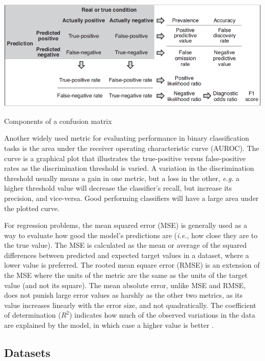 \begin{table}
    \centering
    \includegraphics[width = .7\textwidth]{img/parts/introduction/Confusion Matrix.png}
    \caption{Components of a confusion matrix \citep{Handelman2019}}
    \label{tab:confusion_matrix}
\end{table}

Another widely used metric for evaluating performance in binary classification tasks is the area under the receiver operating characteristic curve (AUROC). The curve is a graphical plot that illustrates the true-positive versus false-positive rates as the discrimination threshold is varied. A variation in the discrimination threshold usually means a gain in one metric, but a loss in the other, \textit{e.g.} a higher threshold value will decrease the classifier's recall, but increase its precision, and vice-versa. Good performing classifiers will have a large area under the plotted curve.\par

For regression problems, the mean squared error (MSE) is generally used as a way to evaluate how good the model's predictions are (\textit{i.e.}, how close they are to the true value). The MSE is calculated as the mean or average of the squared differences between predicted and expected target values in a dataset, where a lower value is preferred. The rooted mean square error (RMSE) is an extension of the MSE where the units of the metric are the same as the units of the target value (and not its square). The mean absolute error, unlike MSE and RMSE, does not punish large error values as harshly as the other two metrics, as its value increases linearly with the error size, and not quadratically. The coefficient of determination ($R^2$) indicates how much of the observed variations in the data are explained by the model, in which case a higher value is better \citep{Handelman2019, Brownlee2021}.

\subsection{Datasets}

